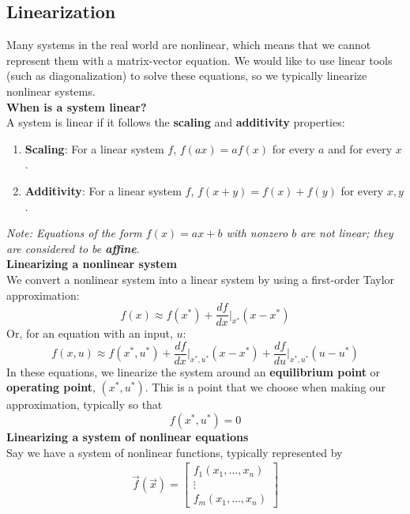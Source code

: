 \subsection*{Linearization}
Many systems in the real world are nonlinear, which means that we cannot represent them with a matrix-vector equation. 
We would like to use linear tools (such as diagonalization) to solve these equations, so we typically linearize nonlinear systems. \\
\newline
\textbf{When is a system linear?} \\
\newline
A system is linear if it follows the \textbf{scaling} and \textbf{additivity} properties:
\begin{enumerate}
    \item \textbf{Scaling}: For a linear system $f$, $\boxed{f(ax) = af(x)}$ for every $a$ and for every $x$.
    \item \textbf{Additivity}: For a linear system $f$, $\boxed{f(x + y) = f(x) + f(y)}$ for every $x, y$.
\end{enumerate}
\textit{Note: Equations of the form $f(x) = ax + b$ with nonzero $b$ are not linear; they are considered to be \textbf{affine}}. \\
\newline
\textbf{Linearizing a nonlinear system} \\
\newline
We convert a nonlinear system into a linear system by using a first-order Taylor approximation:
$$\boxed{f(x) \approx f(x^*) + \frac{df}{dx} \bigg\rvert_{x^*} (x - x^*)}$$
Or, for an equation with an input, $u$:
$$\boxed{f(x, u) \approx f(x^*, u^*) + \frac{df}{dx} \bigg\rvert_{x^*, u^*} (x - x^*) + \frac{df}{du} \bigg\rvert_{x^*, u^*} (u - u^*)}$$
In these equations, we linearize the system around an \textbf{equilibrium point} or \textbf{operating point}, $(x^*, u^*)$. 
This is a point that we choose when making our approximation, typically so that
$$f(x^*, u^*) = 0$$
\newline
\textbf{Linearizing a system of nonlinear equations} \\
\newline
Say we have a system of nonlinear functions, typically represented by
\begin{align*}
    \vec{f}(\vec{x}) = \begin{bmatrix}
        f_1(x_1, \dots, x_n) \\
        \vdots \\
        f_m(x_1, \dots, x_n)
    \end{bmatrix}
\end{align*}
